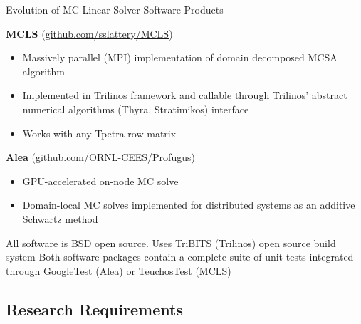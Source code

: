 \documentclass{beamer}
\begin{document}
\begin{frame}{Evolution of MC Linear Solver Software Products}

  {\bf MCLS} (\underline{github.com/sslattery/MCLS})
  \begin{itemize}
  \item Massively parallel (MPI) implementation of domain decomposed MCSA
    algorithm
  \item Implemented in Trilinos framework and callable through Trilinos'
    abstract numerical algorithms (Thyra, Stratimikos) interface
  \item Works with any Tpetra row matrix
  \end{itemize}
  \vfill
  {\bf Alea} (\underline{github.com/ORNL-CEES/Profugus})
  \begin{itemize}
  \item GPU-accelerated on-node MC solve
  \item Domain-local MC solves implemented for distributed systems as an
    additive Schwartz method
  \end{itemize}
  \vfill
  All software is BSD open source.
  \vfill
  Uses TriBITS (Trilinos) open source build system
  \vfill
  Both software packages contain a complete suite of unit-tests integrated
  through GoogleTest (Alea) or TeuchosTest (MCLS)

\end{frame}

\subsection{Research Requirements}
\end{document}
